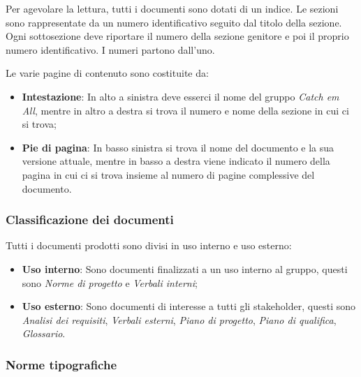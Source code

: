 Per agevolare la lettura, tutti i documenti sono dotati di un indice. Le sezioni sono rappresentate da un numero identificativo seguito dal titolo della sezione. Ogni sottosezione deve riportare il numero della sezione genitore e poi il proprio numero identificativo. I numeri partono dall'uno.

Le varie pagine di contenuto sono costituite da:
\begin{itemize}
    \item \textbf{Intestazione}: In alto a sinistra deve esserci il nome del gruppo \textit{Catch em All}, mentre in altro a destra si trova il numero e nome della sezione in cui ci si trova;
    \item \textbf{Pie di pagina}: In basso sinistra si trova il nome del documento e la sua versione attuale, mentre in basso a destra viene indicato il numero della pagina in cui ci si trova insieme al numero di pagine complessive del documento.
\end{itemize}

\subsubsection{Classificazione dei documenti}
Tutti i documenti prodotti sono divisi in uso interno e uso esterno:
\begin{itemize}
    \item \textbf{Uso interno}: Sono documenti finalizzati a un uso interno al gruppo, questi sono \textit{Norme di progetto} e \textit{Verbali interni};
    \item \textbf{Uso esterno}: Sono documenti di interesse a tutti gli stakeholder, questi sono \textit{Analisi dei requisiti}, \textit{Verbali esterni}, \textit{Piano di progetto}, \textit{Piano di qualifica}, \textit{Glossario}.
\end{itemize}

\subsubsection{Norme tipografiche}


